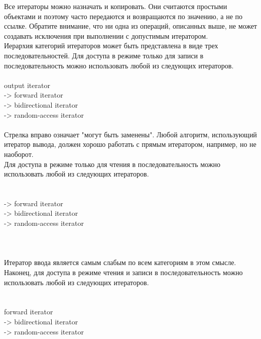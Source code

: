 \documentclass[a4paper,10pt]{article}
\begin{document}
Все итераторы можно назначать и копировать. Они считаются простыми объектами и поэтому часто передаются и возвращаются по значению, а не по ссылке. Обратите внимание, что ни одна из операций, описанных выше, не может создавать исключения при выполнении с допустимым итератором.
\\

Иерархия категорий итераторов может быть представлена в виде трех последовательностей. Для доступа в режиме только для записи в последовательность можно использовать любой из следующих итераторов.
\\


\hline
\\output iterator  
\\   -> forward iterator  
\\   -> bidirectional iterator  
\\   -> random-access iterator  
\hline
\\

\\Стрелка вправо означает "могут быть заменены". Любой алгоритм, использующий итератор вывода, должен хорошо работать с прямым итератором, например, но не наоборот.
\\

Для доступа в режиме только для чтения в последовательность можно использовать любой из следующих итераторов.
\\
\\

\hline
\  
\\   -> forward iterator  
 \\  -> bidirectional iterator  
\\   -> random-access iterator  
\\
\hline
\\
\\

\\Итератор ввода является самым слабым по всем категориям в этом смысле.
\\

Наконец, для доступа в режиме чтения и записи в последовательность можно использовать любой из следующих итераторов.
\\
\\

\hline
\\forward iterator  
\\   -> bidirectional iterator  
\\   -> random-access iterator  
\\
\hline
\\
\end{document}
